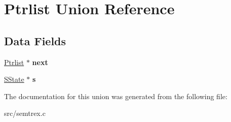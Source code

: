 \hypertarget{unionPtrlist}{\section{Ptrlist Union Reference}
\label{unionPtrlist}
}
\subsection*{Data Fields}
\begin{DoxyCompactItemize}
\item 
\hypertarget{unionPtrlist_aa87791a4feab158095bd0e695d811d36}{\hyperlink{unionPtrlist}{Ptrlist} $\ast$ {\bfseries next}}\label{unionPtrlist_aa87791a4feab158095bd0e695d811d36}

\item 
\hypertarget{unionPtrlist_aae96f1a9654887b7d56ac7a65c163fe1}{\hyperlink{structSState}{S\+State} $\ast$ {\bfseries s}}\label{unionPtrlist_aae96f1a9654887b7d56ac7a65c163fe1}

\end{DoxyCompactItemize}


The documentation for this union was generated from the following file\+:\begin{DoxyCompactItemize}
\item 
src/semtrex.\+c\end{DoxyCompactItemize}
